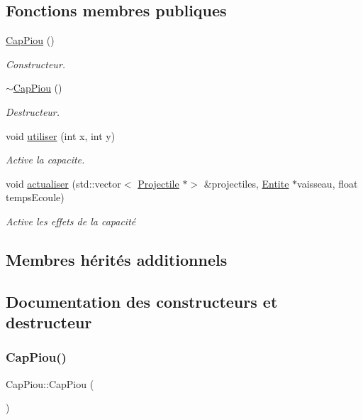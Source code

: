 \subsection*{Fonctions membres publiques}
\begin{DoxyCompactItemize}
\item 
\hyperlink{class_cap_piou_aa2ed61fb1313a447cf8444399001750d}{Cap\+Piou} ()
\begin{DoxyCompactList}\small\item\em Constructeur. \end{DoxyCompactList}\item 
\hyperlink{class_cap_piou_a35d7e0b0c14d6a6e01ba0a053a8a60bd}{$\sim$\+Cap\+Piou} ()
\begin{DoxyCompactList}\small\item\em Destructeur. \end{DoxyCompactList}\item 
void \hyperlink{class_cap_piou_a92f5cc3011280ad13bf3ff5e6a3c76ea}{utiliser} (int x, int y)
\begin{DoxyCompactList}\small\item\em Active la capacite. \end{DoxyCompactList}\item 
void \hyperlink{class_cap_piou_ae15af0a5a261349ae8462f00b6cb0d5d}{actualiser} (std\+::vector$<$ \hyperlink{class_projectile}{Projectile} $\ast$$>$ \&projectiles, \hyperlink{class_entite}{Entite} $\ast$vaisseau, float temps\+Ecoule)
\begin{DoxyCompactList}\small\item\em Active les effets de la capacité \end{DoxyCompactList}\end{DoxyCompactItemize}
\subsection*{Membres hérités additionnels}


\subsection{Documentation des constructeurs et destructeur}
\mbox{\label{class_cap_piou_aa2ed61fb1313a447cf8444399001750d}} 
\subsubsection{\texorpdfstring{Cap\+Piou()}{CapPiou()}}
{\footnotesize\ttfamily Cap\+Piou\+::\+Cap\+Piou (\begin{DoxyParamCaption}{ }\end{DoxyParamCaption})}



